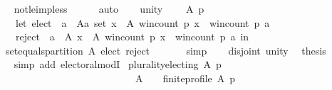 \begin{isabellebody}
\ \ \ \ \isamarkupfalse%
\ not{\isacharunderscore}{\kern0pt}le{\isacharunderscore}{\kern0pt}imp{\isacharunderscore}{\kern0pt}less\isanewline
\ \ \ \ \isamarkupfalse%
\ auto\isanewline
\ \ \isamarkupfalse%
\ unity{\isacharcolon}{\kern0pt}\isanewline
\ \ \ \ {\isachardoublequoteopen}{\isasymforall}A\ p{\isachardot}{\kern0pt}\isanewline
\ \ \ \ \ \ let\ elect\ {\isacharequal}{\kern0pt}\ {\isacharbraceleft}{\kern0pt}a\ {\isasymin}\ {\isacharparenleft}{\kern0pt}A{\isacharcolon}{\kern0pt}{\isacharcolon}{\kern0pt}{\isacharprime}{\kern0pt}a\ set{\isacharparenright}{\kern0pt}{\isachardot}{\kern0pt}\ {\isasymforall}x\ {\isasymin}\ A{\isachardot}{\kern0pt}\ win{\isacharunderscore}{\kern0pt}count\ p\ x\ {\isasymle}\ win{\isacharunderscore}{\kern0pt}count\ p\ a{\isacharbraceright}{\kern0pt}{\isacharsemicolon}{\kern0pt}\isanewline
\ \ \ \ \ \ reject\ {\isacharequal}{\kern0pt}\ {\isacharbraceleft}{\kern0pt}a\ {\isasymin}\ A{\isachardot}{\kern0pt}\ {\isasymexists}x\ {\isasymin}\ A{\isachardot}{\kern0pt}\ win{\isacharunderscore}{\kern0pt}count\ p\ x\ {\isachargreater}{\kern0pt}\ win{\isacharunderscore}{\kern0pt}count\ p\ a{\isacharbraceright}{\kern0pt}\ in\isanewline
\ \ \ \ set{\isacharunderscore}{\kern0pt}equals{\isacharunderscore}{\kern0pt}partition\ A\ {\isacharparenleft}{\kern0pt}elect{\isacharcomma}{\kern0pt}\ reject{\isacharcomma}{\kern0pt}\ {\isacharbraceleft}{\kern0pt}{\isacharbraceright}{\kern0pt}{\isacharparenright}{\kern0pt}{\isachardoublequoteclose}\isanewline
\ \ \ \ \isamarkupfalse%
\ simp\isanewline
\ \ \isamarkupfalse%
\ disjoint\ unity\ \isamarkupfalse%
\ {\isacharquery}{\kern0pt}thesis\isanewline
\ \ \ \ \isamarkupfalse%
\ {\isacharparenleft}{\kern0pt}simp\ add{\isacharcolon}{\kern0pt}\ electoral{\isacharunderscore}{\kern0pt}modI{\isacharparenright}{\kern0pt}\isanewline
{}\isamarkupfalse%
%
\endisatagproof
{\isafoldproof}%
%
\isadelimproof
%
\endisadelimproof
%
\isadelimdocument
%
\endisadelimdocument
%
\isatagdocument
%
\isamarkuptrue%
%
\endisatagdocument
{\isafolddocument}%
%
\isadelimdocument
%
\endisadelimdocument
{}\isamarkupfalse%
\ plurality{\isacharunderscore}{\kern0pt}electing{}{\isacharcolon}{\kern0pt}\ {\isachardoublequoteopen}{\isasymforall}A\ p{\isachardot}{\kern0pt}\isanewline
\ \ \ \ \ \ \ \ \ \ \ \ \ \ \ \ \ \ \ \ \ \ \ \ \ \ \ \ \ \ {\isacharparenleft}{\kern0pt}A\ {\isasymnoteq}\ {\isacharbraceleft}{\kern0pt}{\isacharbraceright}{\kern0pt}\ {\isasymand}\ finite{\isacharunderscore}{\kern0pt}profile\ A\ p{\isacharparenright}{\kern0pt}\ {\isasymlongrightarrow}\isanewline

\end{isabellebody}
